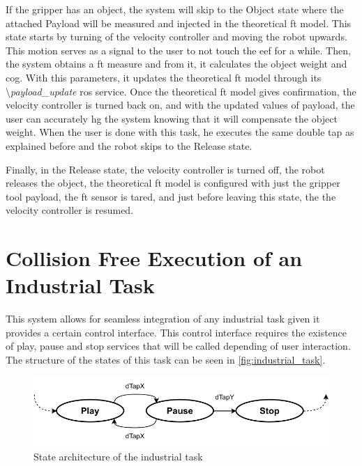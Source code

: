 \par If the gripper has an object, the system will skip to the Object state where the attached Payload will be measured and injected in the theoretical \ac{ft} model. This state starts by turning of the velocity controller and moving the robot upwards. This motion serves as a signal to the user to not touch the \ac{eef} for a while. Then, the system obtains a \ac{ft} measure and from it, it calculates the object weight and \ac{cog}. With this parameters, it updates the theoretical \ac{ft} model through its \textbackslash\textit{payload\_update} \ac{ros} service. Once the theoretical \ac{ft} model gives confirmation, the velocity controller is turned back on, and with the updated values of payload, the user can accurately \ac{hg} the system knowing that it will compensate the object weight. When the user is done with this task, he executes the same double tap as explained before and the robot skips to the Release state.

\par Finally, in the Release state, the velocity controller is turned off, the robot releases the object, the theoretical \ac{ft} model is configured with just the gripper tool payload, the \ac{ft} sensor is tared, and just before leaving this state, the the velocity controller is resumed.






\section{Collision Free Execution of an Industrial Task}


\par This system allows for seamless integration of any industrial task given it provides a certain control interface. This control interface requires the existence of play, pause and stop services that will be called depending of user interaction. The structure of the states of this task can be seen in \autoref{fig:industrial_task}.

\begin{figure}[h]
    \centering
    \includegraphics[width=0.7\linewidth]{figs/chp5/industrial_task.pdf}
    \caption{State architecture of the industrial task}
    \label{fig:industrial_task}
\end{figure}

